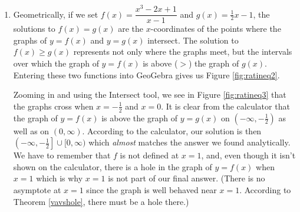 {\begin{enumerate}
Viewing the left hand side as a rational function $r(x)$ we make a sign diagram.  The only value excluded from the domain of $r$ is $x=1$ which is the solution to $2x-2=0$.  The zeros of $r$ are the solutions to $2x^3-x^2-x=0$, which we have already found to be $x=0$, $x=-\frac{1}{2}$ and $x=1$, the latter was discounted as a zero because it is not in the domain.  Choosing test values in each test interval, we obtain the sign diagram in Figure \ref{fig:ratineq1}. 


We are interested in where $r(x) \geq 0$.  We find $r(x) > 0$, or $(+)$, on the intervals $\left(-\infty, -\frac{1}{2}\right)$, $(0,1)$ and $(1, \infty)$.  We add to these intervals the zeros of $r$, $-\frac{1}{2}$ and $0$, to get our final solution:  $\left( - \infty, -\frac{1}{2} \right] \cup [0,1) \cup (1, \infty)$.

\item  Geometrically, if we set $f(x) = \dfrac{x^3-2x+1}{x-1}$ and $g(x) = \frac{1}{2} x -1$, the solutions to $f(x)=g(x)$ are the $x$-coordinates of the points where the graphs of $y=f(x)$ and $y=g(x)$ intersect.  The solution to $f(x) \geq g(x)$ represents not only where the graphs meet, but the intervals over which the graph of $y=f(x)$ is above ($>$) the graph of $g(x)$. Entering these two functions into GeoGebra gives us Figure \ref{fig:ratineq2}. 



Zooming in and using the Intersect tool, we see in Figure \ref{fig:ratineq3} that the graphs cross when $x=-\frac{1}{2}$ and $x=0$.  It is clear from the calculator that the graph of $y=f(x)$ is above the graph of $y=g(x)$ on $\left(-\infty, -\frac{1}{2}\right)$ as well as on $(0,\infty)$.  According to the calculator, our solution is then $\left(-\infty, -\frac{1}{2}\right] \cup [0, \infty)$ which \textit{almost} matches the answer we found analytically.  We have to remember that $f$ is not defined at $x=1$, and, even though it isn't shown on the calculator, there is a hole in the graph of $y=f(x)$ when $x=1$ which is why $x=1$ is not part of our final answer. (There is no asymptote at $x=1$ since the graph is well behaved near $x=1$.  According to Theorem \ref{vavshole}, there  must be a hole there.)

\end{enumerate}
}  

